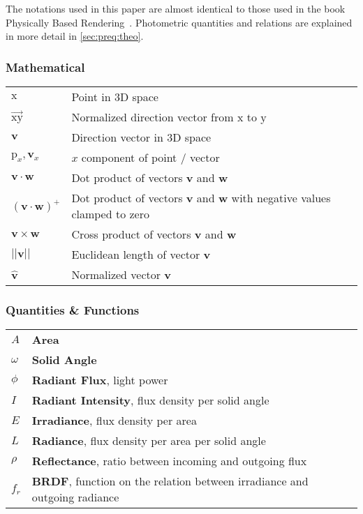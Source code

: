 \documentclass[thesis.tex]{subfiles}
\begin{document}

The notations used in this paper are almost identical to those used in the book Physically Based Rendering~\cite{bib:pbrt}. Photometric quantities and relations are explained in more detail in \autoref{sec:preq:theo}.

\subsubsection*{Mathematical}

\begin{tabular}{ l l }
$\mathrm{x}$ & Point in 3D space \\
$\overrightarrow{\mathrm{x}\mathrm{y}}$ & Normalized direction vector from $\mathrm{x}$ to $\mathrm{y}$\\
$\mathbf{v}$ & Direction vector in 3D space \\
$\mathrm{p}_x, \mathbf{v}_x$ & $x$ component of point / vector\\
$\mathbf{v} \cdot \mathbf{w}$ & Dot product of vectors $\mathbf{v}$ and $\mathbf{w}$\\
$(\mathbf{v} \cdot \mathbf{w})^+$ & Dot product of vectors $\mathbf{v}$ and $\mathbf{w}$ with negative values clamped to zero\\
$\mathbf{v} \times \mathbf{w}$ & Cross product of vectors $\mathbf{v}$ and $\mathbf{w}$\\
$||\mathbf{v}||$ & Euclidean length of vector $\mathbf{v}$\\
$\hat{\mathbf{v}}$ & Normalized vector $\mathbf{v}$
\end{tabular}


\subsubsection*{Quantities \& Functions}

\begin{tabular}{ l l l}
$A$ & \textbf{Area}\\
$\omega$ & \textbf{Solid Angle}\\
$\phi$ & \textbf{Radiant Flux}, light power\\
$I$ & \textbf{Radiant Intensity}, flux density per solid angle\\
$E$ & \textbf{Irradiance}, flux density per area\\
$L$ & \textbf{Radiance}, flux density per area per solid angle\\
$\rho$ & \textbf{Reflectance}, ratio between incoming and outgoing flux\\
$f_r$ & \textbf{BRDF}, function on the relation between irradiance and outgoing radiance\\
\end{tabular}
\end{document}
